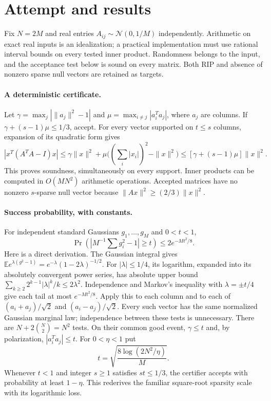 \documentclass[11pt]{article}
\begin{document}
\section{Attempt and results}
Fix $N=2M$ and real entries $A_{ij}\sim\mathcal N(0,1/M)$ independently.
Arithmetic on exact real inputs is an idealization; a practical implementation
must use rational interval bounds on every tested inner product. Randomness
belongs to the input, and the acceptance test below is sound on every matrix.
Both RIP and absence of nonzero sparse null vectors are retained as targets.

\paragraph{A deterministic certificate.}
Let $\gamma=\max_j|\|a_j\|^2-1|$ and
$\mu=\max_{i\ne j}|a_i^Ta_j|$, where $a_j$ are columns. If
$\gamma+(s-1)\mu\le1/3$, accept. For every vector supported on $t\le s$
columns, expansion of its quadratic form gives
\[
|x^T(A^TA-I)x|\le\gamma\|x\|^2+
\mu\big((\sum_i|x_i|)^2-\|x\|^2\big)
\le[\gamma+(s-1)\mu]\|x\|^2.
\]
This proves soundness, simultaneously on every support. Inner products can be
computed in $O(MN^2)$ arithmetic operations. Accepted matrices have no nonzero
$s$-sparse null vector because $\|Ax\|^2\ge(2/3)\|x\|^2$.

\paragraph{Success probability, with constants.}
For independent standard Gaussians $g_1,\ldots,g_M$ and $0<t<1$,
\[
\Pr\left(\left|M^{-1}\sum g_i^2-1\right|\ge t\right)
\le2e^{-Mt^2/8}.
\]
Here is a direct derivation. The Gaussian integral gives
$\mathbb E e^{\lambda(g^2-1)}=e^{-\lambda}(1-2\lambda)^{-1/2}$.
For $|\lambda|\le1/4$, its logarithm, expanded into its absolutely convergent
power series, has absolute upper bound
$\sum_{k\ge2}2^{k-1}|\lambda|^k/k\le2\lambda^2$.
Independence and Markov's inequality with $\lambda=\pm t/4$ give each
tail at most $e^{-Mt^2/8}$.
Apply this to each column and to each of $(a_i+a_j)/\sqrt2$ and
$(a_i-a_j)/\sqrt2$. Every such vector has the same normalized Gaussian
marginal law; independence between these tests is unnecessary. There are
$N+2\binom N2=N^2$ tests. On their common good event,
$\gamma\le t$ and, by polarization, $|a_i^Ta_j|\le t$.
For $0<\eta<1$ put
\[
t=\sqrt{\frac{8\log(2N^2/\eta)}M}.
\]
Whenever $t<1$ and integer $s\ge1$ satisfies $st\le1/3$, the certifier
accepts with probability at least $1-\eta$. This rederives the familiar
square-root sparsity scale with its logarithmic loss.
\end{document}
